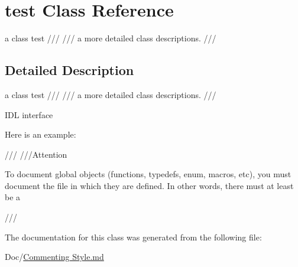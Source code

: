 \hypertarget{classtest}{}\section{test Class Reference}
\label{classtest}


a class test /// /// a more detailed class descriptions. ///  




\subsection{Detailed Description}
a class test /// /// a more detailed class descriptions. /// 

I\+DL interface

Here is an example\+: \begin{DoxyVerb}///
///Attention
\end{DoxyVerb}


To document global objects (functions, typedefs, enum, macros, etc), you must document the file in which they are defined. In other words, there must at least be a \begin{DoxyVerb}///\end{DoxyVerb}
 

The documentation for this class was generated from the following file\+:\begin{DoxyCompactItemize}
\item 
Doc/\hyperlink{Commenting_01Style_8md}{Commenting Style.\+md}\end{DoxyCompactItemize}
